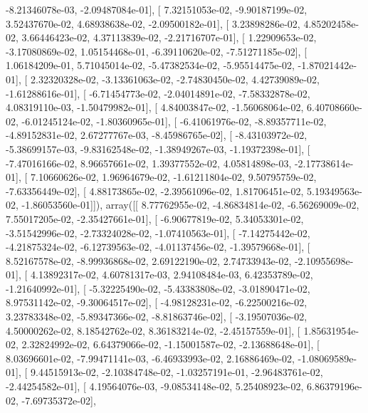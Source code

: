 \documentclass{article}
\begin{document}
         -8.21346078e-03,  -2.09487084e-01],
       [  7.32151053e-02,  -9.90187199e-02,   3.52437670e-02,
          4.68938638e-02,  -2.09500182e-01],
       [  3.23898286e-02,   4.85202458e-02,   3.66446423e-02,
          4.37113839e-02,  -2.21716707e-01],
       [  1.22909653e-02,  -3.17080869e-02,   1.05154468e-01,
         -6.39110620e-02,  -7.51271185e-02],
       [  1.06184209e-01,   5.71045014e-02,  -5.47382534e-02,
         -5.95514475e-02,  -1.87021442e-01],
       [  2.32320328e-02,  -3.13361063e-02,  -2.74830450e-02,
          4.42739089e-02,  -1.61288616e-01],
       [ -6.71454773e-02,  -2.04014891e-02,  -7.58332878e-02,
          4.08319110e-03,  -1.50479982e-01],
       [  4.84003847e-02,  -1.56068064e-02,   6.40708660e-02,
         -6.01245124e-02,  -1.80360965e-01],
       [ -6.41061976e-02,  -8.89357711e-02,  -4.89152831e-02,
          2.67277767e-03,  -8.45986765e-02],
       [ -8.43103972e-02,  -5.38699157e-03,  -9.83162548e-02,
         -1.38949267e-03,  -1.19372398e-01],
       [ -7.47016166e-02,   8.96657661e-02,   1.39377552e-02,
          4.05814898e-03,  -2.17738614e-01],
       [  7.10660626e-02,   1.96964679e-02,  -1.61211804e-02,
          9.50795759e-02,  -7.63356449e-02],
       [  4.88173865e-02,  -2.39561096e-02,   1.81706451e-02,
          5.19349563e-02,  -1.86053560e-01]]), array([[  8.77762955e-02,  -4.86834814e-02,  -6.56269009e-02,
          7.55017205e-02,  -2.35427661e-01],
       [ -6.90677819e-02,   5.34053301e-02,  -3.51542996e-02,
         -2.73324028e-02,  -1.07410563e-01],
       [ -7.14275442e-02,  -4.21875324e-02,  -6.12739563e-02,
         -4.01137456e-02,  -1.39579668e-01],
       [  8.52167578e-02,  -8.99936868e-02,   2.69122190e-02,
          2.74733943e-02,  -2.10955698e-01],
       [  4.13892317e-02,   4.60781317e-03,   2.94108484e-03,
          6.42353789e-02,  -1.21640992e-01],
       [ -5.32225490e-02,  -5.43383808e-02,  -3.01890471e-02,
          8.97531142e-02,  -9.30064517e-02],
       [ -4.98128231e-02,  -6.22500216e-02,   3.23783348e-02,
         -5.89347366e-02,  -8.81863746e-02],
       [ -3.19507036e-02,   4.50000262e-02,   8.18542762e-02,
          8.36183214e-02,  -2.45157559e-01],
       [  1.85631954e-02,   2.32824992e-02,   6.64379066e-02,
         -1.15001587e-02,  -2.13688648e-01],
       [  8.03696601e-02,  -7.99471141e-03,  -6.46933993e-02,
          2.16886469e-02,  -1.08069589e-01],
       [  9.44515913e-02,  -2.10384748e-02,  -1.03257191e-01,
         -2.96483761e-02,  -2.44254582e-01],
       [  4.19564076e-03,  -9.08534148e-02,   5.25408923e-02,
          6.86379196e-02,  -7.69735372e-02],
\end{document}
